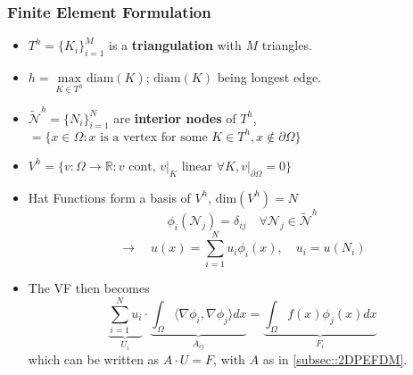     \subsubsection{Finite Element Formulation}
        \begin{itemize}
            \item $T^h = \{ K_i \}_{i=1}^{M}$ is a \textbf{triangulation} with $M$ triangles.
            \item $h = \max\limits_{K \in T^h}\textrm{diam}(K)$; $\textrm{diam}(K)$ being longest edge.
            \item $\widetilde{\mathcal{N}}^h = \{ N_i \}_{i=1}^N$ are \textbf{interior nodes} of $T^h$,\\
            $=\{ x \in \Omega: x \textrm{ is a vertex for some }K \in T^h, x \notin \partial \Omega \}$
            \item $V^h =\{ v:\Omega \to \mathbb{R}: v \textrm{ cont, } v \rvert_{K} \textrm{ linear }\forall K, v \rvert_{\partial \Omega} = 0 \}$
            \item Hat Functions form a basis of $V^h$, $\textrm{dim}(V^h) = N$
            $$ \phi_i(\mathcal{N}_j) = \delta_{ij} \quad \forall \mathcal{N}_j \in \widetilde{\mathcal{N}}^h $$
            \vspace{-1.5em}
            $$ \rightarrow\quad  u(x) = \sum_{i=1}^N u_i \phi_i(x), \quad u_i = u(N_i) $$
            \vspace{-1.5em}
            \item The VF then becomes
                $$
                    \underbrace{\sum_{i=1}^N u_i}_{U_i} \cdot \underbrace{\int_\Omega \langle \nabla \phi_i, \nabla \phi_j \rangle dx}_{A_{ij}} = \underbrace{\int_\Omega f(x) \phi_j(x) dx}_{F_i}
                $$
                which can be written as $A\cdot U = F$, with $A$ as in \ref{subsec::2DPEFDM}.
        \end{itemize}